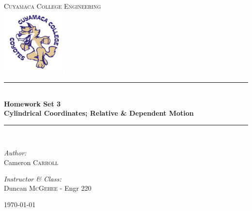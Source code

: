 \documentclass[11pt,letterpaper]{report}
\newcommand{\HRule}{\rule{\linewidth}{0.5mm}}
\begin{document}
\begin{titlepage}
\begin{center}

\textsc{\Large Cuyamaca College Engineering}\\[0.5cm]
\includegraphics[width=0.25\textwidth]{./clogo.jpg}

\HRule \\[0.4cm]
{ \LARGE \bfseries Homework Set 3}\\[0.5cm]
{ \large \bfseries Cylindrical Coordinates; Relative \& Dependent Motion}\\[0.5cm]

\HRule \\[1.5cm]

\begin{minipage}{0.4\textwidth}
\begin{flushleft} \large
\emph{Author:}\\
Cameron \textsc{Carroll}\\[0.2cm]

\end{flushleft}
\end{minipage}
\begin{minipage}{0.4\textwidth}
\begin{flushright} \large
\emph{Instructor \& Class:}\\
Duncan \textsc{McGehee} - Engr 220
\end{flushright}
\end{minipage}

\vfill

{\large \today}

\end{center}
\end{titlepage}
\end{document}
